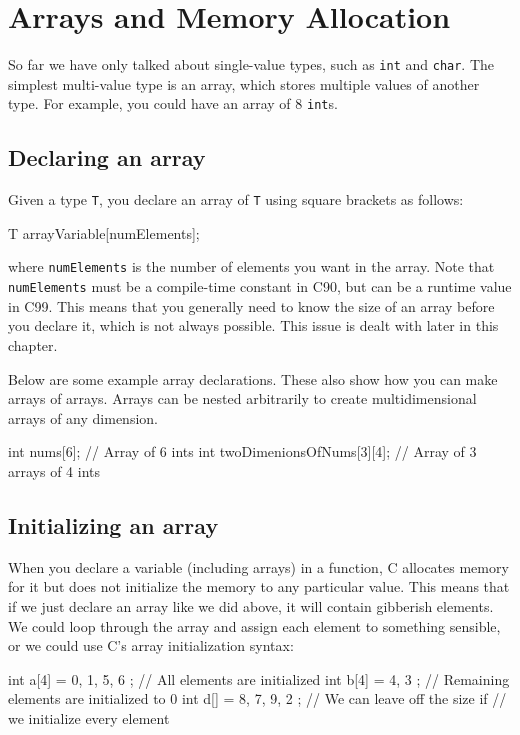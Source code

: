 
\chapter{Arrays and Memory Allocation}

So far we have only talked about single-value types, such as \texttt{int} and \texttt{char}.
The simplest multi-value type is an array, which stores multiple values of another type.
For example, you could have an array of 8 \texttt{int}s.

\section{Declaring an array}

Given a type \texttt{T}, you declare an array of \texttt{T} using square brackets as follows:
\begin{codeinline}
T arrayVariable[numElements];
\end{codeinline}
where \texttt{numElements} is the number of elements you want in the array.
Note that \texttt{numElements} must be a compile-time constant in C90, but can be a runtime value in C99.
This means that you generally need to know the size of an array before you declare it, which is not always possible.
This issue is dealt with later in this chapter.

Below are some example array declarations.
These also show how you can make arrays of arrays.
Arrays can be nested arbitrarily to create multidimensional arrays of any dimension.

\begin{codeblock}
int nums[6]; // Array of 6 ints
int twoDimenionsOfNums[3][4]; // Array of 3 arrays of 4 ints
\end{codeblock}

\section{Initializing an array}

When you declare a variable (including arrays) in a function, C allocates memory for it but does not initialize the memory to any particular value.
This means that if we just declare an array like we did above, it will contain gibberish elements.
We could loop through the array and assign each element to something sensible, or we could use C's array initialization syntax:

\begin{codeblock}
int a[4] = { 0, 1, 5, 6 }; // All elements are initialized
int b[4] = { 4, 3 }; // Remaining elements are initialized to 0
int d[] = { 8, 7, 9, 2 }; // We can leave off the size if
                             // we initialize every element
\end{codeblock}

